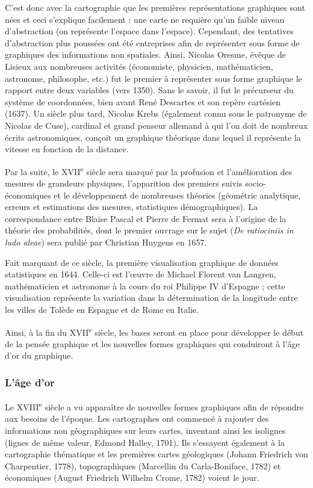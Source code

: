 \documentclass[]{article}
\begin{document}
C'est donc avec la cartographie que les premières représentations graphiques sont nées et ceci s'explique facilement : une carte ne requière qu'un faible niveau d'abstraction (on représente l'espace dans l'espace). Cependant, des tentatives d'abstraction plus poussées ont été entreprises afin de représenter sous forme de graphiques des informations non spatiales. Ainsi, Nicolas Oresme, évêque de Lisieux aux nombreuses activités (économiste, physicien, mathématicien, astronome, philosophe, etc.) fut le premier à représenter sous forme graphique le rapport entre deux variables (vers 1350). Sans le savoir, il fut le précurseur du système de coordonnées, bien avant René Descartes et son repère cartésien (1637). Un siècle plus tard, Nicolas Krebs (également connu sous le patronyme de Nicolas de Cuse), cardinal et grand penseur allemand à qui l'on doit de nombreux écrits astronomiques, conçoit un graphique théorique dans lequel il représente la vitesse en fonction de la distance.

Par la suite, le XVII\textsuperscript{e} siècle sera marqué par la profusion et l'amélioration des mesures de grandeurs physiques, l'apparition des premiers suivis socio-économiques et le développement de nombreuses théories (géométrie analytique, erreurs et estimations des mesures, statistiques démographiques). La correspondance entre Blaise Pascal et Pierre de Fermat sera à l'origine de la théorie des probabilités, dont le premier ouvrage sur le sujet (\emph{De ratiociniis in ludo aleae}) sera publié par Christian Huygens en 1657.

Fait marquant de ce siècle, la première visualisation graphique de données statistiques en 1644. Celle-ci est l'\oe uvre de Michael Florent van Langren, mathématicien et astronome à la cours du roi Philippe IV d'Espagne ; cette visualisation représente la variation dans la détermination de la longitude entre les villes de Tolède en Espagne et de Rome en Italie.

Ainsi, à la fin du XVII\textsuperscript{e} siècle, les bases seront en place pour développer le début de la pensée graphique et les nouvelles formes graphiques qui conduiront à l'âge d'or du graphique.

\hypertarget{lage-dor}{%
\subsubsection{L'âge d'or}\label{lage-dor}}

Le XVIII\textsuperscript{e} siècle a vu apparaître de nouvelles formes graphiques afin de répondre aux besoins de l'époque. Les cartographes ont commencé à rajouter des informations non géographiques sur leurs cartes, inventant ainsi les isolignes (lignes de même valeur, Edmond Halley, 1701). Ils s'essayent également à la cartographie thématique et les premières cartes géologiques (Johann Friedrich von Charpentier, 1778), topographiques (Marcellin du Carla-Boniface, 1782) et économiques (August Friedrich Wilhelm Crome, 1782) voient le jour.
\end{document}
